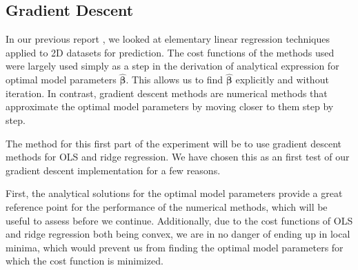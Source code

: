 \subsection{Gradient Descent}
In our previous report \cite{fysstkproject1}, we looked at elementary linear regression techniques applied to 2D datasets for prediction. The cost functions of the  methods used were largely used simply as a step in the derivation of analytical expression for optimal model parameters $\boldsymbol{\hat{\beta}}$.  This allows us to find $\boldsymbol{\hat{\beta}}$ explicitly and without iteration. In contrast, gradient descent methods are numerical methods that approximate the optimal model parameters by moving closer to them step by step. 

The method for this first part of the experiment will be to use gradient descent methods for OLS and ridge regression. We have chosen this as an first test of our gradient descent implementation for a few reasons. 

First, the analytical solutions for the optimal model parameters provide a great reference point for the performance of the numerical methods, which will be useful to assess before we continue. Additionally, due to the cost functions of OLS and ridge regression both being convex, we are in no danger of ending  up in local minima, which would prevent us from finding the optimal model parameters for which the cost function is minimized. 

